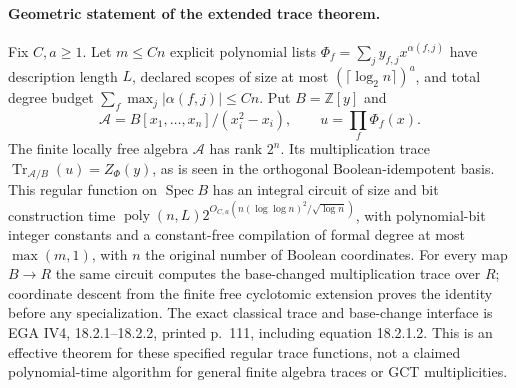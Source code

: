 \paragraph{Geometric statement of the extended trace theorem.}
Fix $C,a\ge1$.  Let $m\le Cn$ explicit polynomial lists
$\Phi_f=\sum_j y_{f,j}x^{\alpha(f,j)}$ have description
length $L$, declared scopes of size at most
$(\lceil\log_2n\rceil)^a$, and total degree budget
$\sum_f\max_j|\alpha(f,j)|\le Cn$.  Put $B=\mathbb Z[y]$ and
\[
 \mathscr A=B[x_1,\ldots,x_n]/(x_i^2-x_i),\qquad
                       u=\prod_f\Phi_f(x).
\]
The finite locally free algebra $\mathscr A$ has rank $2^n$.
Its multiplication trace
$\operatorname{Tr}_{\mathscr A/B}(u)=Z_\Phi(y)$, as is
seen in the orthogonal Boolean-idempotent basis.  This
regular function on $\operatorname{Spec}B$ has an integral
circuit of size and bit construction time
$\operatorname{poly}(n,L)2^{O_{C,a}(n(\log\log n)^2/\sqrt{\log n})}$,
with polynomial-bit integer constants and a constant-free
compilation of formal degree at most $\max(m,1)$, with $n$
the original number of Boolean coordinates.  For every map
$B\to R$ the same circuit computes the base-changed
multiplication trace over $R$; coordinate descent from
the finite free cyclotomic extension proves the identity
before any specialization.  The exact classical trace
and base-change interface is EGA IV4, 18.2.1--18.2.2,
printed p.~111, including equation 18.2.1.2.  This is an
effective theorem for these specified regular trace
functions, not a claimed polynomial-time algorithm for
general finite algebra traces or GCT multiplicities.
